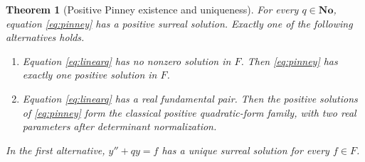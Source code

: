 \documentclass[11pt,a4paper]{article}
\numberwithin{equation}{section}
\newtheorem{theorem}{Theorem}[section]
\theoremstyle{definition}
\theoremstyle{remark}
\newcommand{\No}{\mathbf{No}}
\begin{document}
\begin{theorem}[Positive Pinney existence and uniqueness]\label{thm:pinney}
For every $q\in\No$, equation \eqref{eq:pinney} has a positive surreal
solution. Exactly one of the following alternatives holds.
\begin{enumerate}
\item Equation \eqref{eq:linearq} has no nonzero solution in $F$. Then
\eqref{eq:pinney} has exactly one positive solution in $F$.
\item Equation \eqref{eq:linearq} has a real fundamental pair. Then the
positive solutions of \eqref{eq:pinney} form the classical positive
quadratic-form family, with two real parameters after determinant
normalization.
\end{enumerate}
In the first alternative, $y''+qy=f$ has a unique surreal solution for
every $f\in F$.
\end{theorem}
\end{document}
